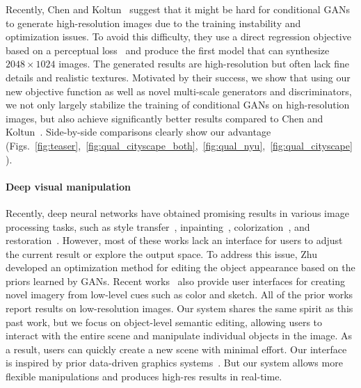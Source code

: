 Recently, Chen and Koltun~\cite{chen2017photographic} suggest that it might be hard for conditional GANs to generate high-resolution images due to the training instability and optimization issues. To avoid this difficulty, they use a direct regression objective based on a perceptual loss~\cite{gatys2016image,dosovitskiy2016generating,johnson2016perceptual} and produce the first model that can synthesize $2048\times 1024$ images. The generated results are high-resolution but often lack fine details and realistic textures. Motivated by their success, we show that using our new objective function as well as novel multi-scale generators and discriminators, we not only largely stabilize the training of conditional GANs on high-resolution images, but also achieve significantly better results compared to Chen and Koltun~\cite{chen2017photographic}. Side-by-side comparisons clearly show our advantage (Figs.~\ref{fig:teaser},~\ref{fig:qual_cityscape_both},~\ref{fig:qual_nyu},~\ref{fig:qual_cityscape}). 

\paragraph{Deep visual manipulation} Recently, deep neural networks have obtained promising results in various image processing tasks, such as style transfer~\cite{gatys2016image}, inpainting~\cite{pathak2016context}, colorization~\cite{zhang2016colorful}, and restoration~\cite{gharbi2016deep}. However, most of these works lack an interface for users to adjust the current result or explore the output space. To address this issue, Zhu~\etal~\cite{zhu2016generative} developed an optimization method for editing the object appearance based on the priors learned by GANs. Recent works~\cite{isola2016image,sangkloy2016scribbler,zhang2017real} also provide user interfaces for creating novel imagery from low-level cues such as color and sketch. All of the prior works report results on low-resolution images. Our system shares the same spirit as this past work, but we focus on object-level semantic editing, allowing users to interact with the entire scene and manipulate individual objects in the image. As a result, users can quickly create a new scene with minimal effort. Our interface is inspired by prior data-driven graphics systems~\cite{johnson2006semantic,lalonde2007photo,chen2009sketch2photo}. But our system allows more flexible manipulations and produces high-res results in real-time. 

